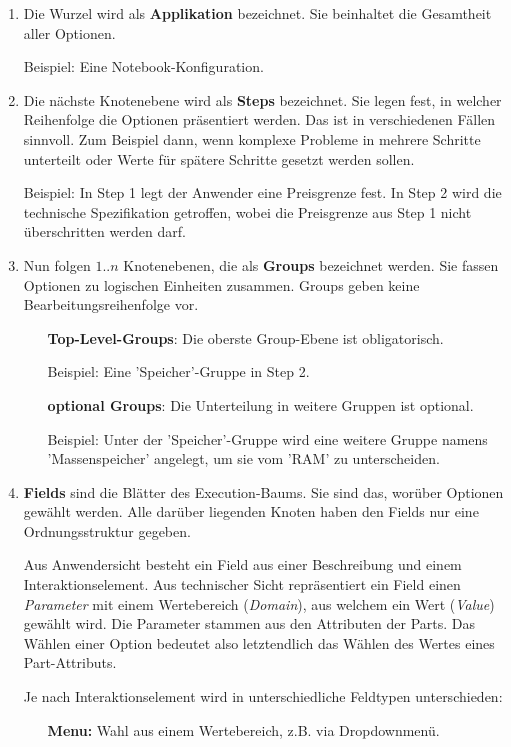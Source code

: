 \documentclass[11pt, a4paper, titlepage, listof=totoc, bibliography=totoc, index=totoc, twoside, openright, headings=normal, draft]{scrreprt}
\begin{document}
\begin{enumerate}[1.]
\item Die Wurzel wird als \textbf{Applikation} bezeichnet. Sie beinhaltet die Gesamtheit aller Optionen.

Beispiel: Eine Notebook-Konfiguration.
\item Die nächste Knotenebene wird als \textbf{Steps} bezeichnet. Sie legen fest, in welcher Reihenfolge die Optionen präsentiert werden. Das ist in verschiedenen Fällen sinnvoll. Zum Beispiel dann, wenn komplexe Probleme in mehrere Schritte unterteilt oder Werte für spätere Schritte gesetzt werden sollen.

Beispiel: In Step 1 legt der Anwender eine Preisgrenze fest. In Step 2 wird die technische Spezifikation getroffen, wobei die Preisgrenze aus Step 1 nicht überschritten werden darf.
\item  Nun folgen $1..n$ Knotenebenen, die als \textbf{Groups} bezeichnet werden. Sie fassen Optionen zu logischen Einheiten zusammen. Groups geben keine Bearbeitungsreihenfolge vor.
\begin{enumerate}
\item[\textbf{Top-Level-Groups}:] Die oberste Group-Ebene  ist obligatorisch.

Beispiel: Eine 'Speicher'-Gruppe in Step 2.
\item[\textbf{optional Groups}:] Die Unterteilung in weitere Gruppen ist optional.

Beispiel: Unter der 'Speicher'-Gruppe wird eine weitere Gruppe namens 'Massenspeicher' angelegt, um sie vom 'RAM' zu unterscheiden.
\end{enumerate}
\item \textbf{Fields} sind die Blätter des Execution-Baums. Sie sind das, worüber Optionen gewählt werden. Alle darüber liegenden Knoten haben den Fields nur eine Ordnungsstruktur gegeben.

Aus Anwendersicht besteht ein Field aus einer Beschreibung und einem Interaktionselement. Aus technischer Sicht repräsentiert ein Field einen \emph{Parameter} mit einem Wertebereich (\emph{Domain}), aus welchem ein Wert (\emph{Value}) gewählt wird. Die Parameter stammen aus den Attributen der Parts. Das Wählen einer Option bedeutet also letztendlich das Wählen des Wertes eines Part-Attributs.

Je nach Interaktionselement wird in unterschiedliche Feldtypen unterschieden:
\begin{enumerate}[(a)]
\item [\textbf{Menu:}] Wahl aus einem Wertebereich, z.B. via Dropdownmenü.


\end{enumerate}
\end{enumerate}
\end{document}
